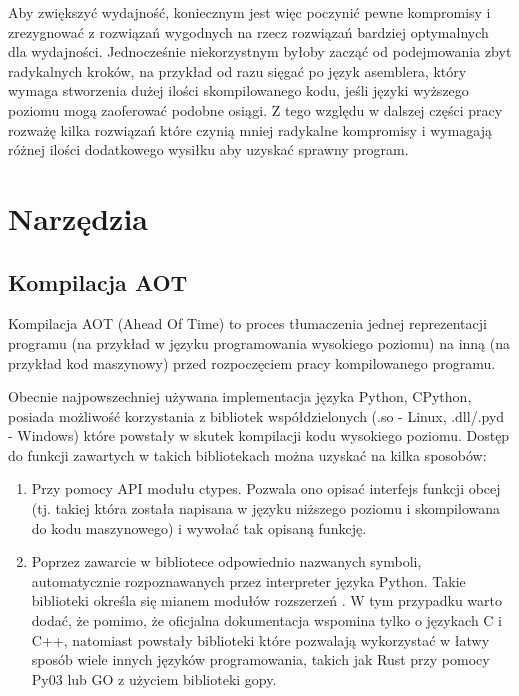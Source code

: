 \documentclass[11pt, a4paper]{article}
\begin{document}
\begin{sloppypar}
    Aby zwiększyć wydajność, koniecznym jest więc poczynić pewne kompromisy i
    zrezygnować z rozwiązań wygodnych na rzecz rozwiązań bardziej optymalnych dla
    wydajności. Jednocześnie niekorzystnym byłoby zacząć od podejmowania zbyt radykalnych
    kroków, na przykład od razu sięgać po język asemblera, który wymaga stworzenia dużej
    ilości skompilowanego kodu, jeśli języki wyższego poziomu mogą zaoferować podobne
    osiągi. Z tego względu w dalszej części pracy rozważę kilka rozwiązań które czynią mniej
    radykalne kompromisy i wymagają różnej ilości dodatkowego wysiłku aby uzyskać sprawny
    program.

    \section{Narzędzia}
    \subsection{Kompilacja AOT}
    Kompilacja AOT (Ahead Of Time) to proces tłumaczenia jednej reprezentacji programu (na
    przykład w języku programowania wysokiego poziomu) na inną (na przykład kod
    maszynowy) przed rozpoczęciem pracy kompilowanego programu.

    Obecnie najpowszechniej używana implementacja języka Python, CPython, posiada możliwość
    korzystania z bibliotek współdzielonych (.so - Linux, .dll/.pyd - Windows) które powstały
    w skutek kompilacji kodu wysokiego poziomu. Dostęp do funkcji zawartych w takich
    bibliotekach można uzyskać na kilka sposobów:

    \begin{enumerate}
      \item Przy pomocy API modułu ctypes\cite{Python_ctypes}. Pozwala ono opisać interfejs
        funkcji obcej (tj. takiej która została napisana w języku niższego poziomu i skompilowana
        do kodu maszynowego) i wywołać tak opisaną funkcję.

      \item Poprzez zawarcie w bibliotece odpowiednio nazwanych symboli, automatycznie
        rozpoznawanych przez interpreter języka Python. Takie biblioteki określa się mianem
        modułów rozszerzeń \cite{Extending_Python_With_C_Cpp}. W tym przypadku warto
        dodać, że pomimo, że oficjalna dokumentacja wspomina tylko o językach C i C++, natomiast
        powstały biblioteki które pozwalają wykorzystać w łatwy sposób wiele innych języków
        programowania, takich jak Rust przy pomocy Py03\cite{PyO3} lub GO z użyciem biblioteki
        gopy\cite{gopy}.


\end{enumerate}
\end{sloppypar}
\end{document}
